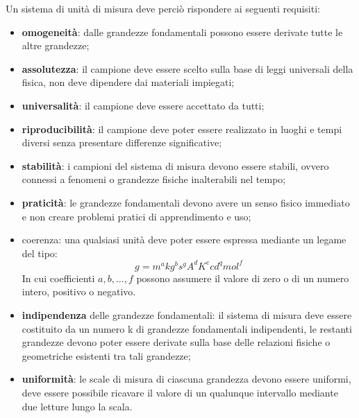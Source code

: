 \documentclass[a4paper, 15pt]{article}
\begin{document}
\begin{adjustwidth}{2in}{}
	Un sistema di unità di misura deve perciò rispondere ai seguenti requisiti: 
	\begin{itemize}
		\item \textbf{omogeneità}: dalle grandezze fondamentali possono essere derivate tutte le altre grandezze;
		\item \textbf{assolutezza}: il campione deve essere scelto sulla base di leggi universali della fisica, non deve dipendere dai materiali impiegati;
		\item \textbf{universalità}: il campione deve essere accettato da tutti;
		\item \textbf{riproducibilità}: il campione deve poter essere realizzato in luoghi e tempi diversi senza presentare differenze significative;
		\item \textbf{stabilità}: i campioni del sistema di misura devono essere stabili, ovvero connessi a fenomeni o grandezze fisiche inalterabili nel tempo;
		\item \textbf{praticità}: le grandezze fondamentali devono avere un senso fisico immediato e non creare problemi pratici di apprendimento e uso;
		\item coerenza: una qualsiasi unità deve poter essere espressa mediante un legame del
		tipo:
		\[g = m^a kg^b s^g A^d K^e cd^q mol^f\]
		In cui  coefficienti $a,b,…,f$ possono assumere il valore di zero o di un numero intero,	positivo o negativo.
		\item \textbf{indipendenza} delle grandezze fondamentali: il sistema di misura deve essere costituito da un numero k di grandezze fondamentali indipendenti, le restanti
		grandezze devono poter essere derivate sulla base delle relazioni fisiche o
		geometriche esistenti tra tali grandezze;
		\item \textbf{uniformità}: le scale di misura di ciascuna grandezza devono essere uniformi, deve essere possibile ricavare il valore di un qualunque intervallo mediante due letture lungo la scala.
	\end{itemize}
\end{adjustwidth}
\end{document}

